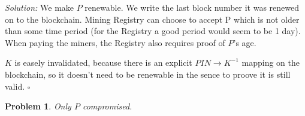 \documentclass{article}
\newtheorem{problem}{Problem}
\newenvironment{solution}
  {\emph{Solution:}}
  {\hfill $\square$}
\begin{document}
\begin{solution}
  We make $P$ renewable. We write the last block number it was renewed on to the blockchain.
  Mining Registry can choose to accept P which is not older than some time period (for the Registry a good period would seem to be 1 day).
  When paying the miners, the Registry also requires proof of $P$'s age.

  $K$ is easely invalidated, because there is an explicit $PIN \rightarrow K^{-1}$ mapping on the blockchain, so it doesn't need to be renewable in the sence to proove it is still valid.
\end{solution}
\begin{problem}
  Only $P$ compromised.
\end{problem}
\end{document}
